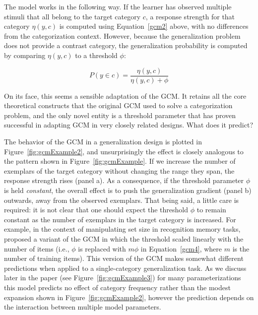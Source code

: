\documentclass[doc,apacite]{apa6}
\begin{document}
The model works in the following way. If the learner has observed multiple stimuli that all belong to the target category $c$, a response strength for that category $\eta(y,c)$ is computed using Equation~\ref{gcm2} above, with no differences from the categorization context. However, because the generalization problem does not provide a contrast category, the generalization probability is computed by comparing $\eta(y,c)$ to a threshold $\phi$:

\begin{equation}
\label{gcm4}
P(y \in c) = \frac{\eta(y,c)}{\eta(y,c) + \phi}
\end{equation}

On its face, this seems a sensible adaptation of the GCM. It retains all the core theoretical constructs that the original GCM used to solve a categorization problem, and the only novel entity is a threshold parameter that has proven successful in adapting GCM in very closely related designs. What does it predict?

The behavior of the GCM in a generalization design is plotted in Figure~\ref{fig:gcmExample2}, and unsurprisingly the effect is closely analogous to the pattern shown in Figure~\ref{fig:gcmExample}. If we increase the number of exemplars of the target category without changing the range they span, the response strength rises (panel a). As a consequence, if the threshold parameter $\phi$ is held {\it constant}, the overall effect is to push the generalization gradient (panel b) outwards, away from the observed exemplars. That being said, a little care is required: it is not clear that one should expect the threshold $\phi$ to remain constant as the number of exemplars in the target category is increased. For example, in the context of manipulating set size in recognition memory tasks,  proposed a variant of the GCM in which the threshold scaled linearly with the number of items (i.e., $\phi$ is replaced with $m\phi$ in Equation~\ref{gcm4}, where $m$ is the number of training items). This version of the GCM makes somewhat different predictions when applied to a single-category generalization task. As we discuss later in the paper (see Figure~\ref{fig:gcmExample3}) for many parameterizations this model predicts no effect of category frequency rather than the modest expansion shown in Figure~\ref{fig:gcmExample2}, however the prediction depends on the interaction between multiple model parameters.
\end{document}
